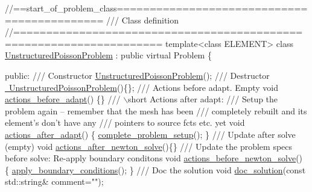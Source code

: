  
\begin{DoxyCodeInclude}
\textcolor{comment}{//==start\_of\_problem\_class============================================}
\textcolor{comment}{/// Class definition}
\textcolor{comment}{}\textcolor{comment}{//====================================================================}
\textcolor{keyword}{template}<\textcolor{keyword}{class} ELEMENT>
\textcolor{keyword}{class }\hyperlink{classUnstructuredPoissonProblem}{UnstructuredPoissonProblem} : \textcolor{keyword}{public} \textcolor{keyword}{virtual} Problem
\{

\textcolor{keyword}{public}:
\textcolor{comment}{}
\textcolor{comment}{ /// Constructor}
\textcolor{comment}{} \hyperlink{classUnstructuredPoissonProblem_a26e7610a714aea17c9278beec4842371}{UnstructuredPoissonProblem}();
    \textcolor{comment}{}
\textcolor{comment}{ /// Destructor}
\textcolor{comment}{} \hyperlink{classUnstructuredPoissonProblem_aeae85592e36ba7be6b4891fb49d2197b}{~UnstructuredPoissonProblem}()\{\};
\textcolor{comment}{}
\textcolor{comment}{ /// Actions before adapt. Empty}
\textcolor{comment}{} \textcolor{keywordtype}{void} \hyperlink{classUnstructuredPoissonProblem_ac9627efd3c311156e5347ed37d4ea4b0}{actions\_before\_adapt}() \{\}
 \textcolor{comment}{}
\textcolor{comment}{ /// \(\backslash\)short Actions after adapt: }
\textcolor{comment}{ /// Setup the problem again -- remember that the mesh has been}
\textcolor{comment}{ /// completely rebuilt and its element's don't have any}
\textcolor{comment}{ /// pointers to source fcts etc. yet}
\textcolor{comment}{} \textcolor{keywordtype}{void} \hyperlink{classUnstructuredPoissonProblem_a6f3e089824cfbb4f458efd8c8ffd376d}{actions\_after\_adapt}()
  \{
   \hyperlink{classUnstructuredPoissonProblem_a5cbf00790e8469b43c64c6aaadfe7b41}{complete\_problem\_setup}();
  \}
 \textcolor{comment}{}
\textcolor{comment}{ /// Update after solve (empty)}
\textcolor{comment}{} \textcolor{keywordtype}{void} \hyperlink{classUnstructuredPoissonProblem_a822bd18e50ebeefd6d1c196fad7c0bf1}{actions\_after\_newton\_solve}()\{\}
\textcolor{comment}{}
\textcolor{comment}{ /// Update the problem specs before solve: Re-apply boundary conditons}
\textcolor{comment}{} \textcolor{keywordtype}{void} \hyperlink{classUnstructuredPoissonProblem_a2ab9d23c0e6e6631ffe1a761f6bdf026}{actions\_before\_newton\_solve}()
  \{
   \hyperlink{classUnstructuredPoissonProblem_ace8b8b3097ae2024a0589b2bf9b4ee7b}{apply\_boundary\_conditions}();
  \}
  \textcolor{comment}{}
\textcolor{comment}{ /// Doc the solution}
\textcolor{comment}{} \textcolor{keywordtype}{void} \hyperlink{classUnstructuredPoissonProblem_a9b21a3c3f574da71411f852006fe2a0c}{doc\_solution}(\textcolor{keyword}{const} std::string& comment=\textcolor{stringliteral}{""});
 


\end{DoxyCodeInclude}
